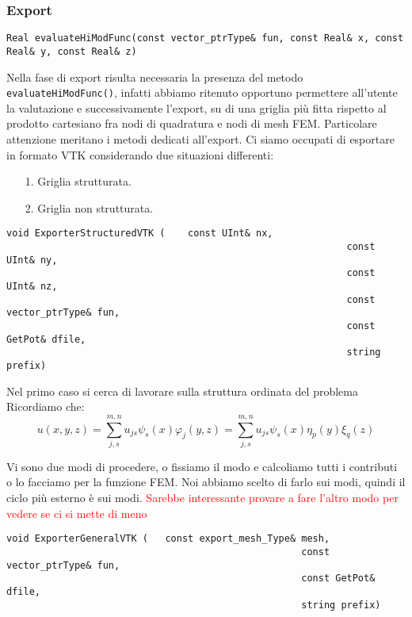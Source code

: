\subsubsection{Export}

\begin{lstlisting}[style = general, frame = none]
Real evaluateHiModFunc(const vector_ptrType& fun, const Real& x, const Real& y, const Real& z)
\end{lstlisting}

Nella fase di export risulta necessaria la presenza del metodo \texttt{evaluateHiModFunc()}, infatti abbiamo ritenuto opportuno permettere 
all'utente la valutazione e successivamente l'export, su di una griglia pi\`u fitta rispetto al prodotto cartesiano fra nodi di quadratura e 
nodi di mesh FEM. 
Particolare attenzione meritano i metodi dedicati all'export. Ci siamo occupati di esportare in formato VTK considerando due situazioni 
differenti:
\begin{itemize}
\item[1.] Griglia strutturata.
\item[2.] Griglia non strutturata.
\end{itemize}
\begin{lstlisting}[style = general]
void ExporterStructuredVTK (	const UInt& nx,
															const UInt& ny,
															const UInt& nz,
															const vector_ptrType& fun,
															const GetPot& dfile, 
															string prefix)
\end{lstlisting}
Nel primo caso si cerca di lavorare sulla struttura ordinata del problema
Ricordiamo che:
\begin{equation}
u(x,y,z) = \sum_{j,s}^{m,n}u_{js}\psi_s(x)\varphi_j(y,z) = \sum_{j,s}^{m,n}u_{js}\psi_s(x)\eta_p(y)\xi_q(z)
\end{equation}

Vi sono due modi di procedere, o fissiamo il modo e calcoliamo tutti i contributi o lo facciamo per la funzione FEM.
Noi abbiamo scelto di farlo sui modi, quindi il ciclo pi\`u esterno \`e sui modi.
\textcolor{red}{Sarebbe interessante provare a fare l'altro modo per vedere se ci si mette di meno}

\begin{lstlisting}[style = general]
void ExporterGeneralVTK (	const export_mesh_Type& mesh,
													const vector_ptrType& fun,
													const GetPot& dfile,
													string prefix)
\end{lstlisting}


